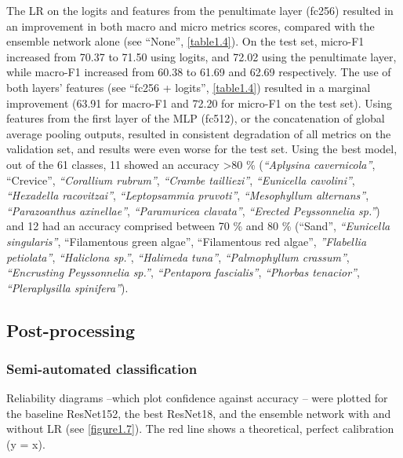 The LR on the logits and features from the penultimate layer (fc256) resulted in an improvement in both macro and micro metrics scores, compared with the ensemble network alone (see “None”, \autoref{table1.4}). On the test set, micro-F1 increased from 70.37 to 71.50 using logits, and 72.02 using the penultimate layer, while macro-F1 increased from 60.38 to 61.69 and 62.69 respectively. The use of both layers’ features (see “fc256 + logits”, \autoref{table1.4}) resulted in a marginal improvement (63.91 for macro-F1 and 72.20 for micro-F1 on the test set). Using features from the first layer of the MLP (fc512), or the concatenation of global average pooling outputs, resulted in consistent degradation of all metrics on the validation set, and results were even worse for the test set. Using the best model, out of the 61 classes, 11 showed an accuracy >80 \% (\textit{“Aplysina cavernicola”}, “Crevice”, \textit{“Corallium rubrum”}, \textit{“Crambe tailliezi”}, \textit{“Eunicella cavolini”}, \textit{“Hexadella racovitzai”}, \textit{“Leptopsammia pruvoti”}, \textit{“Mesophyllum alternans”}, \textit{“Parazoanthus axinellae”}, \textit{“Paramuricea clavata”}, \textit{“Erected Peyssonnelia sp.”}) and 12 had an accuracy comprised between 70 \% and 80 \% (“Sand”, \textit{“Eunicella singularis”}, “Filamentous green algae”, “Filamentous red algae”, \textit{”Flabellia petiolata”}, \textit{“Haliclona sp.”}, \textit{“Halimeda tuna”}, \textit{“Palmophyllum crassum”}, \textit{“Encrusting Peyssonnelia sp.”}, \textit{“Pentapora fascialis”}, \textit{“Phorbas tenacior”}, \textit{“Pleraplysilla spinifera”}).

\subsection{Post-processing}\label{chapitre1_6.3}

\subsubsection{Semi-automated classification}\label{chapitre1_6.3.1}
Reliability diagrams –which plot confidence against accuracy – were plotted for the baseline ResNet152, the best ResNet18, and the ensemble network with and without LR (see \autoref{figure1.7}). The red line shows a theoretical, perfect calibration (y = x).

